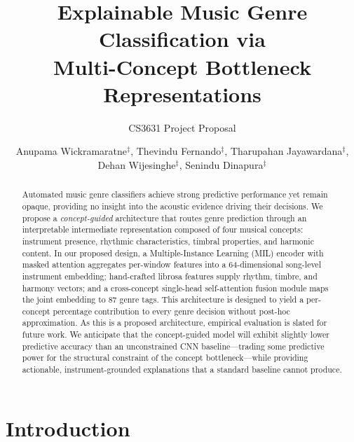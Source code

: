 \documentclass[sigconf,nonacm]{acmart}
\begin{document}
\title{Explainable Music Genre Classification via\\Multi-Concept Bottleneck Representations}
\subtitle{CS3631 Project Proposal}

\author{%
Anupama Wickramaratne$^{\ddagger}$,
Thevindu Fernando$^{\ddagger}$,
Tharupahan Jayawardana$^{\ddagger}$,
Dehan Wijesinghe$^{\ddagger}$,
Senindu Dinapura$^{\ddagger}$}

\begin{abstract}
Automated music genre classifiers achieve strong predictive performance yet remain opaque,
providing no insight into the acoustic evidence driving their decisions. We propose a
\emph{concept-guided} architecture that routes genre prediction through an interpretable
intermediate representation composed of four musical concepts: instrument presence, rhythmic
characteristics, timbral properties, and harmonic content. In our proposed design, a
Multiple-Instance Learning (MIL) encoder with masked attention aggregates per-window features
into a 64-dimensional song-level instrument embedding; hand-crafted librosa features supply
rhythm, timbre, and harmony vectors; and a cross-concept single-head self-attention fusion
module maps the joint embedding to 87 genre tags. This architecture is designed to yield a
per-concept percentage contribution to every genre decision without post-hoc approximation.
As this is a proposed architecture, empirical evaluation is slated for future work. We anticipate
that the concept-guided model will exhibit slightly lower predictive accuracy than an unconstrained
CNN baseline---trading some predictive power for the structural constraint of the concept
bottleneck---while providing actionable, instrument-grounded explanations that a standard
baseline cannot produce.
\end{abstract}


\maketitle

\section{Introduction}
\end{document}
